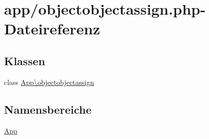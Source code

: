 \hypertarget{objectobjectassign_8php}{}\section{app/objectobjectassign.php-\/\+Dateireferenz}
\label{objectobjectassign_8php}
\subsection*{Klassen}
\begin{DoxyCompactItemize}
\item 
class \hyperlink{classApp_1_1objectobjectassign}{App\textbackslash{}objectobjectassign}
\end{DoxyCompactItemize}
\subsection*{Namensbereiche}
\begin{DoxyCompactItemize}
\item 
 \hyperlink{namespaceApp}{App}
\end{DoxyCompactItemize}
